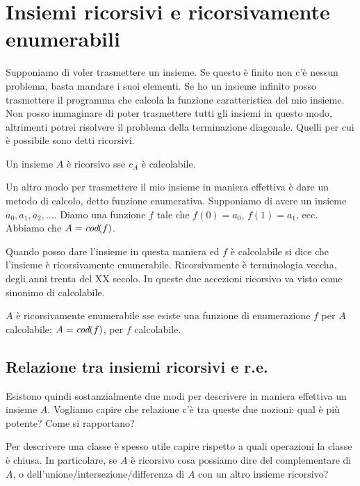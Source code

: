 \chapter{Insiemi ricorsivi e ricorsivamente enumerabili}

Supponiamo di voler trasmettere un insieme. Se questo è finito non c'è nessun problema, basta
mandare i suoi elementi. Se ho un insieme infinito posso trasmettere il programma che calcola la
funzione caratteristica del mio insieme. Non posso immaginare di poter trasmettere tutti gli insiemi
in questo modo, altrimenti potrei risolvere il problema della terminazione diagonale. Quelli per
cui è possibile sono detti ricorsivi.

\begin{defn}
    Un insieme $A$ è ricorsivo sse $c_{A}$ è calcolabile.
\end{defn}

Un altro modo per trasmettere il mio insieme in maniera effettiva è dare un metodo di calcolo,
detto funzione enumerativa. Supponiamo di avere un insieme ${a_{0},a_{1},a_{2},\dotsc}.$ Diamo una
funzione $f$ tale che $f(0) = a_{0}$, $f(1) = a_{1}$, ecc. Abbiamo che $A = \textit{cod}(f)$.

Quando posso dare l'insieme in questa maniera ed $f$ è calcolabile si dice che l'insieme è
ricorsivamente enumerabile. Ricorsivamente è terminologia veccha, degli anni trenta del XX secolo.
In queste due accezioni ricorsivo va visto come sinonimo di calcolabile.

\begin{defn}
    $A$ è ricorsivamente enumerabile sse esiste una funzione di enumerazione $f$ per $A$
    calcolabile: $A = \textit{cod}(f)$, per $f$ calcolabile.
\end{defn}

\section{Relazione tra insiemi ricorsivi e r.e.}

Esistono quindi sostanzialmente due modi per descrivere in maniera effettiva un insieme $A$.
Vogliamo capire che relazione c'è tra queste due nozioni: qual è più potente? Come si rapportano?

Per descrivere una classe è spesso utile capire rispetto a quali operazioni la classe è chiusa. In
particolare, se $A$ è ricorsivo cosa possiamo dire del complementare di $A$, o
dell'unione/intersezione/differenza di $A$ con un altro insieme ricorsivo?

